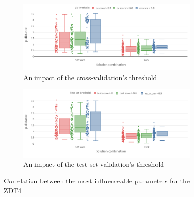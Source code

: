     \begin{figure}
        \centering

        \begin{subfigure}{\textwidth}
            \includegraphics[width=\textwidth]{content/images/conf_zdt4_cv_score}
            \caption{An impact of the cross-validation's threshold}
            \label{fig:zdt4_pred_solver}
        \end{subfigure} 
        \begin{subfigure}{\textwidth}
            \includegraphics[width=\textwidth]{content/images/conf_zdt4_test_score}
            \caption{An impact of the test-set-validation's threshold}
            \label{fig:zdt4_comb_valid}
        \end{subfigure}

        \caption[Correlation between the most influenceable parameters for the ZDT4]{Correlation between the most influenceable parameters for the ZDT4} 
        \label{fig:conf_zdt6}    
    \end{figure}






